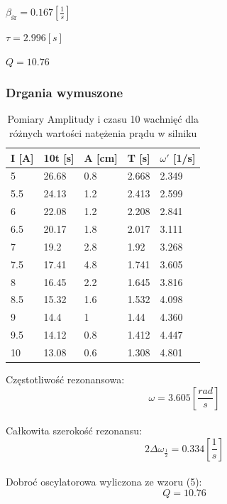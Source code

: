 \documentclass[]{article}
\begin{document}
	$\beta_{\text{śr}} = 0.167 \left[ \frac{1}{s}\right] $
	
	$\tau=2.996[s]$
	
	$Q = 10.76$
	
	\subsubsection{Drgania wymuszone}
	
	\begin{table}[h]
		\centering
		\caption{Pomiary Amplitudy i czasu 10 wachnięć dla różnych wartości natężenia prądu w silniku}
		\begin{tabular}{|l|l|l|l|l|}
			\hline
			
			I [A] & 10t [s] & A [cm] & T [s] & $\omega'$ [1/s] \\ \hline
			5 & 26.68 & 0.8 & 2.668 & 2.349 \\ \hline
			5.5 & 24.13 & 1.2 & 2.413 & 2.599 \\ \hline
			6 & 22.08 & 1.2 & 2.208 & 2.841 \\ \hline
			6.5 & 20.17 & 1.8 & 2.017 & 3.111 \\ \hline
			7 & 19.2 & 2.8 & 1.92 & 3.268 \\ \hline
			7.5 & 17.41 & 4.8 & 1.741 & 3.605 \\ \hline
			8 & 16.45 & 2.2 & 1.645 & 3.816 \\ \hline
			8.5 & 15.32 & 1.6 & 1.532 & 4.098 \\ \hline
			9 & 14.4 & 1 & 1.44 & 4.360 \\ \hline
			9.5 & 14.12 & 0.8 & 1.412 & 4.447 \\ \hline
			10 & 13.08 & 0.6 & 1.308 & 4.801 \\ \hline
			
		\end{tabular}
	\end{table}
	
	Częstotliwość rezonansowa:
	$$\omega = 3.605 \left[ \frac{rad}{s}\right]$$\\
	Całkowita szerokość rezonansu:
	$$2\Delta\omega_{\frac{1}{2}} = 0.334 \left[ \frac{1}{s}\right] $$\\	
	Dobroć oscylatorowa wyliczona ze wzoru (5):
	$$Q = 10.76$$
	
\end{document}
